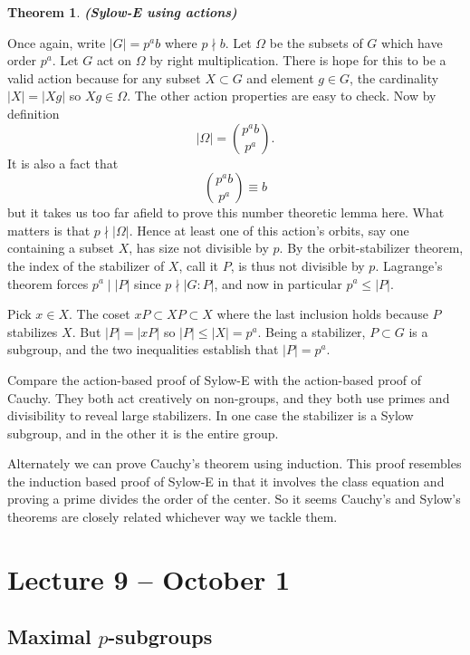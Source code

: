 \documentclass[letterpaper]{article}
\newtheorem{theorem}{Theorem}[section]
\newenvironment{proof}[1][Proof]{\begin{trivlist}
\item[\hskip \labelsep {\bfseries #1}]}{\end{trivlist}}
\begin{document}
\begin{theorem}
\emph{\textbf{(Sylow-E using actions)}}
\end{theorem}
\begin{proof}
Once again, write $|G| = p^ab$ where $p \nmid b$. Let $\Omega$ be
the subsets of $G$ which have order $p^a$. Let $G$ act on $\Omega$
by right multiplication. There is hope for this to be a valid action
because for any subset $X \subset G$ and element $g \in G$, the
cardinality $|X| = |Xg|$ so $Xg \in \Omega$. The other action
properties are easy to check. Now by definition \[|\Omega| = {p^ab
\choose p^a}.\] It is also a fact that \[{p^ab \choose p^a} \equiv
b\] but it takes us too far afield to prove this number theoretic
lemma here. What matters is that $p \nmid |\Omega|$. Hence at least
one of this action's orbits, say one containing a subset $X$, has
size not divisible by $p$. By the orbit-stabilizer theorem, the
index of the stabilizer of $X$, call it $P$, is thus not divisible
by $p$. Lagrange's theorem forces $p^a \mid |P|$ since $p \nmid |G
\colon P|$, and now in particular $p^a \leq |P|$.

Pick $x \in X$. The coset $xP \subset XP \subset X$ where the last
inclusion holds because $P$ stabilizes $X$. But $|P| = |xP|$ so
$|P| \leq |X| = p^a$. Being a stabilizer, $P \subset G$ is a subgroup,
and the two inequalities establish that $|P| = p^a$.
\end{proof}

Compare the action-based proof of Sylow-E with the action-based
proof of Cauchy. They both act creatively on non-groups, and they
both use primes and divisibility to reveal large stabilizers. In
one case the stabilizer is a Sylow subgroup, and in the other it
is the entire group.

Alternately we can prove Cauchy's theorem using induction. This
proof resembles the induction based proof of Sylow-E in that it
involves the class equation and proving a prime divides the order
of the center. So it seems Cauchy's and Sylow's theorems are closely
related whichever way we tackle them.

\section{Lecture 9 -- October 1}

\subsection{Maximal $p$-subgroups}
\end{document}
